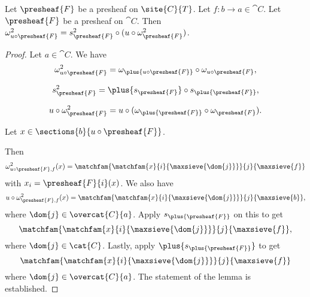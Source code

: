 \begin{lemma}
Let $\presheaf{F}$ be a presheaf on $\site{C}{T}$.
Let $f:b\rightarrow a \in \cat{C}$.
Let $\presheaf{F}$ be a presheaf on $\cat{C}$.
Then $\omega^2_{u\circ \presheaf{F}} = s^2_{\presheaf{F}} \circ (u \circ \omega^2_{\presheaf{F}})$.
\end{lemma}

\begin{proof}
Let $a\in \cat{C}$.
We have
\[\omega^2_{u\circ \presheaf{F}} = \omega_{\plus{u\circ \presheaf{F}}} \circ \omega_{u\circ \presheaf{F}},\]

\[s^2_{\presheaf{F}} = \plus{s_{\presheaf{F}}} \circ s_{\plus{\presheaf{F}}},\]

\[u \circ \omega^2_{\presheaf{F}} = u\circ (\omega_{\plus{\presheaf{F}}} \circ \omega_{\presheaf{F}}).\]

Let $x \in \sections{b}{u \circ \presheaf{F}}$.

Then 
\[\omega^2_{u\circ \presheaf{F},f}(x) = \matchfam{\matchfam{x}{i}{\maxsieve{\dom{j}}}}{j}{\maxsieve{f}}\]
with $x_i = \presheaf{F}{i}(x)$.
We also have 
\[u \circ \omega^2_{\presheaf{F},f}(x) = \matchfam{\matchfam{x}{i}{\maxsieve{\dom{j}}}} {j}{\maxsieve{b}},\]
where $\dom{j} \in \overcat{C}{a}$.
Apply 
$s_{\plus{\presheaf{F}}}$ on this to get 
\[\matchfam{\matchfam{x}{i}{\maxsieve{\dom{j}}}}{j}{\maxsieve{f}},\]
where $\dom{j} \in \cat{C}$.
Lastly, apply $\plus{s_{\plus{\presheaf{F}}}}$ to get
\[\matchfam{\matchfam{x}{i}{\maxsieve{\dom{j}}}}{j}{\maxsieve{f}}\]
where $\dom{j} \in \overcat{C}{a}$. 
The statement of the lemma is established.
\end{proof}